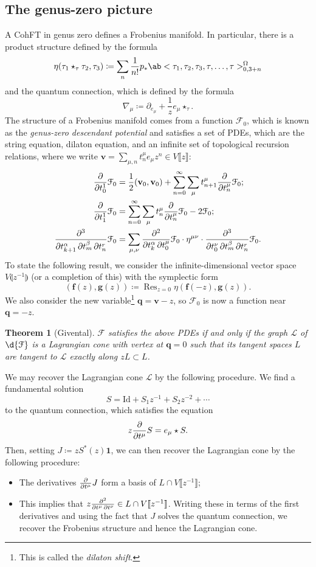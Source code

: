 \documentclass[10pt]{amsart}
\newtheorem{thm}{Theorem}[section]
\theoremstyle{definition}
\theoremstyle{remark}
\theoremstyle{plain}
\theoremstyle{definition}
\theoremstyle{remark}
\newcommand{\mc}[1]{\mathcal{#1}}
\newcommand{\mbf}[1]{\mathbf{#1}}
\newcommand{\bv}{\mbf{v}}
\newcommand{\bq}{\mbf{q}}
\newcommand{\mr}[1]{\mathrm{#1}}
\newcommand{\on}[1]{\operatorname{#1}}
\newcommand{\1}{\mathbf{1}}
\newcommand{\2}{\mathbf{2}}
\newcommand{\3}{\mathbf{3}}
\newcommand{\ps}[1]{\llbracket #1 \rrbracket}
\newcommand{\ls}[1]{\llparenthesis #1 \rrparenthesis}
\begin{document}
\subsection{The genus-zero picture}%
\label{sub:The genus-zero picture}

A CohFT in genus zero defines a Frobenius manifold. In particular, there is a product structure defined by the formula
\[ \eta(\tau_1 \star_{\tau} \tau_2, \tau_3) \coloneqq \sum_n \frac{1}{n!} p_* \ab<\tau_1, \tau_2, \tau_3, \tau,\ldots, \tau>_{0,3+n}^{\Omega} \]
and the quantum connection, which is defined by the formula
\[ \nabla_{\mu} \coloneqq \partial_{e_{\mu}} + \frac{1}{z} e_{\mu} \star_{\tau}. \]
The structure of a Frobenius manifold comes from a function $\mc{F}_0$, which is known as the \textit{genus-zero descendant potential} and satisfies a set of PDEs, which are the string equation, dilaton equation, and an infinite set of topological recursion relations, where we write $\bv = \sum_{\mu,n} t^{\mu}_n e_{\mu} z^n \in V\ps{z}$:
\begin{align*}
    \pdv{}{t_0^1} \mc{F}_0 &= \frac{1}{2} (\bv_0, \bv_0) + \sum_{n=0}^{\infty} \sum_{\mu} t_{n+1}^{\mu} \pdv{}{t_n^{\mu}} \mc{F}_0; \\
    \pdv{}{t_1^1} \mc{F}_0 &= \sum_{n=0}^{\infty} \sum_{\mu} t_n^{\mu} \pdv{}{t_n^{\mu}}\mc{F}_0 - 2 \mc{F}_0; \\
    \pdv{}{t_{k+1}^{\alpha},t_m^{\beta},t_n^{r}} \mc{F}_0 &= \sum_{\mu,\nu} \pdv{}{t_k^{\alpha},t_0^{\mu}} \mc{F}_0 \cdot \eta^{\mu\nu} \cdot \pdv{}{t_0^{\nu},t_{m}^{\beta},t_n^{r}} \mc{F}_0.
\end{align*}
To state the following result, we consider the infinite-dimensional vector space $V\ls{z^{-1}}$ (or a completion of this) with the symplectic form
\[ (\mbf{f}(z), \mbf{g}(z)) \coloneqq \on{Res}_{z=0}\eta(\mbf{f}(-z), \mbf{g}(z)). \]
We also consider the new variable\footnote{This is called the \textit{dilaton shift}.} $\bq = \bv - z$, so $\mc{F}_0$ is now a function near $\bq = -z$.

\begin{thm}[Givental]
    $\mc{F}$ satisfies the above PDEs if and only if the graph $\mc{L}$ of $\d{\mc{F}}$ is a Lagrangian cone with vertex at $\bq = 0$ such that its tangent spaces $L$ are tangent to $\mc{L}$ exactly along $zL \subset L$.
\end{thm}

We may recover the Lagrangian cone $\mc{L}$ by the following procedure. We find a fundamental solution 
\[ S = \mr{Id} + S_1 z^{-1} + S_2 z^{-2} + \cdots \]
to the quantum connection, which satisfies the equation
\[ z \pdv{}{t^{\mu}}S = e_{\mu} \star S. \]
Then, setting $J \coloneqq z S^*(z) \1$, we can then recover the Lagrangian cone by the following procedure:
\begin{itemize}
    \item The derivatives $\pdv{}{t^{\mu}} J$ form a basis of $L \cap V\ps{z^{-1}}$;
    \item This implies that $z \pdv{}{t^{\mu},t^{\nu}} \in L \cap V \ps{z^{-1}}$. Writing these in terms of the first derivatives and using the fact that $J$ solves the quantum connection, we recover the Frobenius structure and hence the Lagrangian cone.
\end{itemize}
\end{document}
